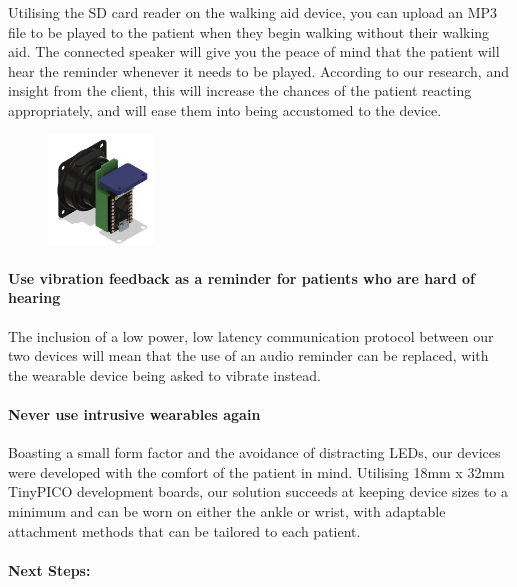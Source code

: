 		Utilising the SD card reader on the walking aid device, you can upload an MP3 file to be played to the patient when they begin walking without their walking aid. The connected speaker will give you the peace of mind that the patient will hear the reminder whenever it needs to be played. According to our research, and insight from the client, this will increase the chances of the patient reacting appropriately, and will ease them into being accustomed to the device.

		\begin{figure}
			\vspace{-1em}
			\centering
			\includegraphics[width=0.25\textwidth]{graphics/hardware.png}
		\end{figure}

		\paragraph{Use vibration feedback as a reminder for patients who are hard of hearing}\mbox{}

		The inclusion of a low power, low latency communication protocol between our two devices will mean that the use of an audio reminder can be replaced, with the wearable device being asked to vibrate instead.

		\newpage

		\paragraph{Never use intrusive wearables again}\mbox{}

		Boasting a small form factor and the avoidance of distracting LEDs, our devices were developed with the comfort of the patient in mind. Utilising 18mm x 32mm TinyPICO development boards, our solution succeeds at keeping device sizes to a minimum and can be worn on either the ankle or wrist, with adaptable attachment methods that can be tailored to each patient.

		\vspace{5em}
		\paragraph{Next Steps:}\mbox{}

